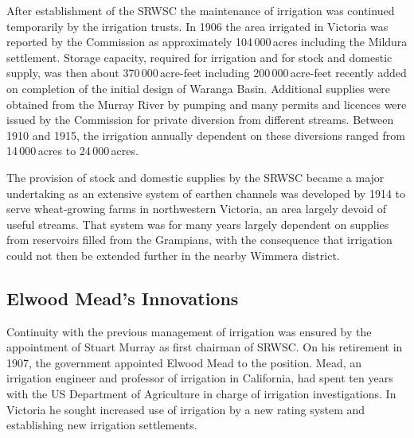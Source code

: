 After establishment of the SRWSC the maintenance of irrigation was
continued temporarily by the irrigation trusts.  In 1906 the area
irrigated in Victoria was reported by the Commission as approximately
104\,000\,acres including the Mildura settlement.  Storage capacity, required for irrigation and for stock and
domestic supply, was then about 370\,000\,acre-feet including
200\,000\,acre-feet recently added on completion of the initial design
of Waranga Basin.  Additional supplies were obtained from the Murray
River by pumping and many permits
and licences were issued by the Commission for private diversion from
different streams.  Between 1910 and 1915, the irrigation annually
dependent on these diversions ranged from 14\,000\,acres to
24\,000\,acres.

The provision of stock and domestic supplies by the SRWSC became a
major undertaking as an extensive system of earthen
channels was developed by 1914 to serve
wheat-growing farms in northwestern Victoria, an area
largely devoid of useful streams. That system was for many years
largely dependent on supplies from
reservoirs filled from the Grampians, with
the consequence that irrigation could not then be extended further in
the nearby Wimmera district.

\subsection*{Elwood Mead's Innovations}

Continuity with the previous management of irrigation was ensured by
the appointment of Stuart Murray  as first chairman
of SRWSC.  On his retirement in 1907, the government appointed Elwood
Mead to the position.  Mead, an irrigation engineer and professor of
irrigation in California, had spent ten years with
the US Department of Agriculture in charge of irrigation
investigations.  In Victoria he sought increased use of irrigation by
a new rating system and establishing new irrigation settlements.


